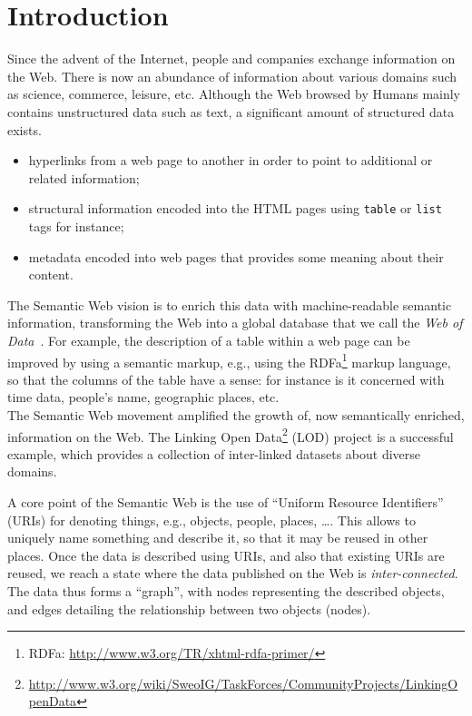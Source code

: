 \chapter{Introduction}
\label{chap:introduction}

Since the advent of the Internet, people and companies exchange information on the Web. There is now an abundance of information about various domains such as science, commerce, leisure, etc. Although the Web browsed by Humans mainly contains unstructured data such as text, a significant amount of structured data exists.

\begin{itemize}
\item hyperlinks from a web page to another in order to point to additional or related information;
\item structural information encoded into the HTML pages using \texttt{table} or \texttt{list} tags for instance;
\item metadata encoded into web pages that provides some meaning about their content.
\end{itemize}

The Semantic Web vision is to enrich this data with machine-readable semantic information, transforming the Web into a global database that we call the \emph{Web of Data}~\cite{bizer:2009:linked}. For example, the description of a table within a web page can be improved by using a semantic markup, e.g., using the RDFa\footnote{RDFa: \url{http://www.w3.org/TR/xhtml-rdfa-primer/}} markup language, so that the columns of the table have a sense: for instance is it concerned with time data, people's name, geographic places, etc.\\

The Semantic Web movement amplified the growth of, now semantically enriched, information on the Web. The Linking Open Data\footnote{\url{http://www.w3.org/wiki/SweoIG/TaskForces/CommunityProjects/LinkingOpenData}} (LOD) project is a successful example, which provides a collection of inter-linked datasets about diverse domains.

A core point of the Semantic Web is the use of ``Uniform Resource Identifiers'' (URIs) for denoting things, e.g., objects, people, places, \ldots. This allows to uniquely name something and describe it, so that it may be reused in other places. Once the data is described using URIs, and also that existing URIs are reused, we reach a state where the data published on the Web is \emph{inter-connected}. The data thus forms a ``graph'', with nodes representing the described objects, and edges detailing the relationship between two objects (nodes).


